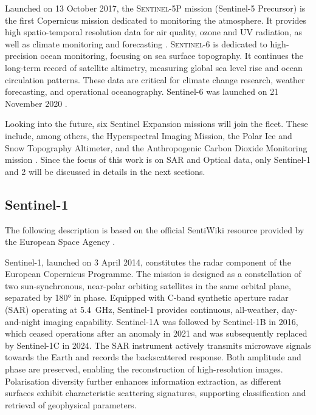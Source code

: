 Launched on 13 October 2017, the \textsc{Sentinel-5P} mission (Sentinel-5 Precursor) is the first Copernicus mission dedicated to monitoring the atmosphere. It provides high spatio-temporal resolution data for air quality, ozone and UV radiation, as well as climate monitoring and forecasting \cite{ESA_SentinelMissions}.
\textsc{Sentinel-6} is dedicated to high-precision ocean monitoring, focusing on sea surface topography. It continues the long-term record of satellite altimetry, measuring global sea level rise and ocean circulation patterns. These data are critical for climate change research, weather forecasting, and operational oceanography. Sentinel-6 was launched on 21 November 2020 \cite{ESA_SentinelMissions}. 

Looking into the future, six Sentinel Expansion missions will join the fleet. These include, among others, the Hyperspectral Imaging Mission, the Polar Ice and Snow Topography Altimeter, and the Anthropogenic Carbon Dioxide Monitoring mission \cite{ESA_Copernicus}.
Since the focus of this work is on SAR and Optical data, only Sentinel-1 and 2 will be discussed in details in the next sections. 



\subsection{Sentinel-1}
The following description is based on the official SentiWiki resource provided by the European Space Agency \cite{sentiwiki}. 

Sentinel-1, launched on 3 April 2014, constitutes the radar component of the European Copernicus Programme. The mission is designed as a constellation of two sun-synchronous, near-polar orbiting satellites in the same orbital plane, separated by 180° in phase. Equipped with C-band synthetic aperture radar (SAR) operating at 5.4~GHz, Sentinel-1 provides continuous, all-weather, day-and-night imaging capability. Sentinel-1A was followed by Sentinel-1B in 2016, which ceased operations after an anomaly in 2021 and was subsequently replaced by Sentinel-1C in 2024.  
The SAR instrument actively transmits microwave signals towards the Earth and records the backscattered response. Both amplitude and phase are preserved, enabling the reconstruction of high-resolution images. Polarisation diversity further enhances information extraction, as different surfaces exhibit characteristic scattering signatures, supporting classification and retrieval of geophysical parameters.  

